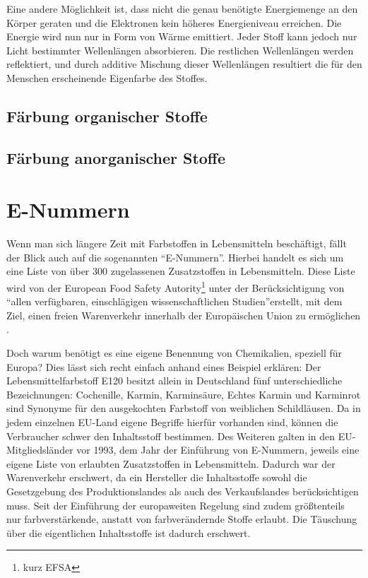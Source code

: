 \documentclass[11pt]{scrreprt}
\begin{document}
Eine andere Möglichkeit ist, dass nicht die genau benötigte Energiemenge an den Körper geraten und die Elektronen kein höheres Energieniveau erreichen. Die Energie wird nun nur in Form von Wärme emittiert. Jeder Stoff kann jedoch nur Licht bestimmter Wellenlängen absorbieren. Die restlichen Wellenlängen werden reflektiert, und durch additive Mischung dieser Wellenlängen resultiert die für den Menschen erscheinende Eigenfarbe des Stoffes\cite[S.9-15]{Jenette.1983}.

\section{Färbung organischer Stoffe}
\section{Färbung anorganischer Stoffe}

\chapter{E-Nummern}
Wenn man sich längere Zeit mit Farbstoffen in Lebensmitteln beschäftigt, fällt der Blick auch auf die sogenannten \enquote{E-Nummern}. Hierbei handelt es sich um eine Liste von über 300 zugelassenen Zusatzstoffen in Lebensmitteln. Diese Liste wird von der European Food Safety Autority\footnote{kurz EFSA} unter der Berücksichtigung von \enquote{allen verfügbaren, einschlägigen wissenschaftlichen Studien}erstellt, mit dem Ziel, einen freien Warenverkehr innerhalb der Europäischen Union zu ermöglichen \cite{EFSAisanagencyoftheEuropeanUnion.2016}.

Doch warum benötigt es eine eigene Benennung von Chemikalien, speziell für Europa?
Dies lässt sich recht einfach anhand eines Beispiel erklären: Der Lebensmittelfarbstoff E120 besitzt allein in Deutschland fünf unterschiedliche Bezeichnungen: Cochenille, Karmin, Karminsäure, Echtes Karmin und Karminrot sind Synonyme  für den ausgekochten Farbstoff von weiblichen Schildläusen. Da in jedem einzelnen EU-Land eigene Begriffe hierfür vorhanden sind, können die Verbraucher schwer den Inhaltsstoff bestimmen.
Des Weiteren galten in den EU-Mitgliedsländer vor 1993, dem Jahr der Einführung von E-Nummern, jeweils eine eigene Liste von erlaubten Zusatzstoffen in Lebensmitteln. Dadurch war der Warenverkehr erschwert, da ein Hersteller die Inhaltsstoffe sowohl die Gesetzgebung des Produktionslandes als auch des Verkaufslandes berücksichtigen muss. Seit der Einführung der europaweiten Regelung sind zudem größtenteils nur farbverstärkende, anstatt von farbverändernde Stoffe erlaubt. Die Täuschung über die eigentlichen Inhaltsstoffe ist dadurch erschwert.
\end{document}
